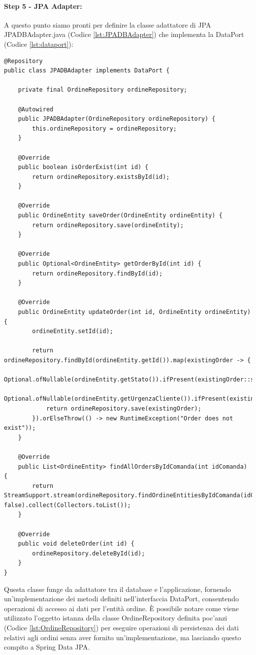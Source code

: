\paragraph{Step 5 - JPA Adapter:}
A questo punto siamo pronti per definire la classe adattatore di JPA JPADBAdapter.java (Codice \vref{lst:JPADBAdapter}) che implementa la DataPort (Codice \vref{lst:dataport}):
\begin{lstlisting}[style=myJava, 
    caption={Classe adattatore JPA JPADBAdapter.java}, label=lst:JPADBAdapter, 
    emph={[2] ordineRepository, log, logger},
    emphstyle={[2]\color{codeDarkMagenta}}]
@Repository
public class JPADBAdapter implements DataPort {

    private final OrdineRepository ordineRepository;

    @Autowired
    public JPADBAdapter(OrdineRepository ordineRepository) {
        this.ordineRepository = ordineRepository;
    }

    @Override
    public boolean isOrderExist(int id) {
        return ordineRepository.existsById(id);
    }

    @Override
    public OrdineEntity saveOrder(OrdineEntity ordineEntity) {
        return ordineRepository.save(ordineEntity);
    }

    @Override
    public Optional<OrdineEntity> getOrderById(int id) {
        return ordineRepository.findById(id);
    }

    @Override
    public OrdineEntity updateOrder(int id, OrdineEntity ordineEntity) {
        ordineEntity.setId(id);

        return ordineRepository.findById(ordineEntity.getId()).map(existingOrder -> {
            Optional.ofNullable(ordineEntity.getStato()).ifPresent(existingOrder::setStato);
            Optional.ofNullable(ordineEntity.getUrgenzaCliente()).ifPresent(existingOrder::setUrgenzaCliente);
            return ordineRepository.save(existingOrder);
        }).orElseThrow(() -> new RuntimeException("Order does not exist"));
    }

    @Override
    public List<OrdineEntity> findAllOrdersByIdComanda(int idComanda) {
        return StreamSupport.stream(ordineRepository.findOrdineEntitiesByIdComanda(idComanda).spliterator(), false).collect(Collectors.toList());
    }

    @Override
    public void deleteOrder(int id) {
        ordineRepository.deleteById(id);
    }
}
\end{lstlisting}
Questa classe funge da adattatore tra il database e l'applicazione, fornendo un’implementazione dei metodi definiti nell’interfaccia DataPort, consentendo operazioni di accesso ai dati per l'entità ordine. È possibile notare come viene utilizzato l'oggetto istanza della classe OrdineRepository definita poc'anzi (Codice \vref{lst:OrdineRepository}) per eseguire operazioni di persistenza dei dati relativi agli ordini senza aver fornito un'implementazione, ma lasciando questo compito a Spring Data JPA.
